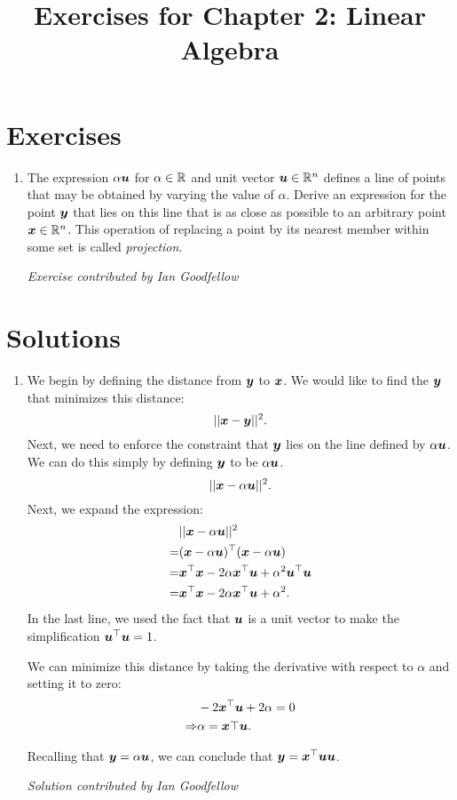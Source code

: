 \documentclass{article}
\title{Exercises for Chapter 2: Linear Algebra}
\begin{document}
\maketitle

\section*{Exercises}
\begin{enumerate}
\item The expression $\alpha {\bm{u}}$ for $\alpha \in \mathbb{R}$ and
unit vector ${\bm{u}} \in \mathbb{R}^n$ defines a line of points that may be obtained by varying the
value of $\alpha$.
Derive an expression for the point ${\bm{y}}$ that lies on this line that is
as close as possible to an arbitrary point ${\bm{x}} \in \mathbb{R}^n$.
This operation of replacing a point by its nearest member within some set
is called {\em projection}.


{\em Exercise contributed by Ian Goodfellow}
\end{enumerate}

\section*{Solutions}
\begin{enumerate}
\item We begin by defining the distance from ${\bm{y}}$ to ${\bm{x}}$. We would like to
find the ${\bm{y}}$ that minimizes this distance:
\begin{equation}
|| {\bm{x}} - {\bm{y}}||^2.
\end{equation}
Next, we need to enforce the constraint that ${\bm{y}}$ lies on the line defined
by $\alpha {\bm{u}}$. We can do this simply by defining ${\bm{y}}$ to be $\alpha {\bm{u}}$.
\begin{equation}
|| {\bm{x}} - \alpha {\bm{u}} ||^2.
\end{equation}
Next, we expand the expression:
\begin{align}
& || {\bm{x}} - \alpha {\bm{u}} ||^2 \\
=& ( {\bm{x}} - \alpha {\bm{u}} )^\top ({\bm{x}} - \alpha {\bm{u}}) \\
=& {\bm{x}}^\top {\bm{x}} - 2 \alpha {\bm{x}}^\top {\bm{u}} + \alpha^2 {\bm{u}}^\top {\bm{u}} \\
=& {\bm{x}}^\top {\bm{x}} - 2 \alpha {\bm{x}}^\top {\bm{u}} + \alpha^2.
\end{align}
In the last line, we used the fact that ${\bm{u}}$ is a unit vector to make
the simplification ${\bm{u}}^\top {\bm{u}} = 1$.

We can minimize this distance by taking the derivative with respect to
$\alpha$ and setting it to zero:
\begin{align}
& - 2  {\bm{x}}^\top {\bm{u}} + 2 \alpha = 0 \\
\Rightarrow & \alpha = {\bm{x}}\top {\bm{u}}.
\end{align}

Recalling that ${\bm{y}} = \alpha {\bm{u}}$, we can conclude that ${\bm{y}} = {\bm{x}}^\top {\bm{u}} {\bm{u}}$.

{\em Solution contributed by Ian Goodfellow}


\end{enumerate}
\end{document}
